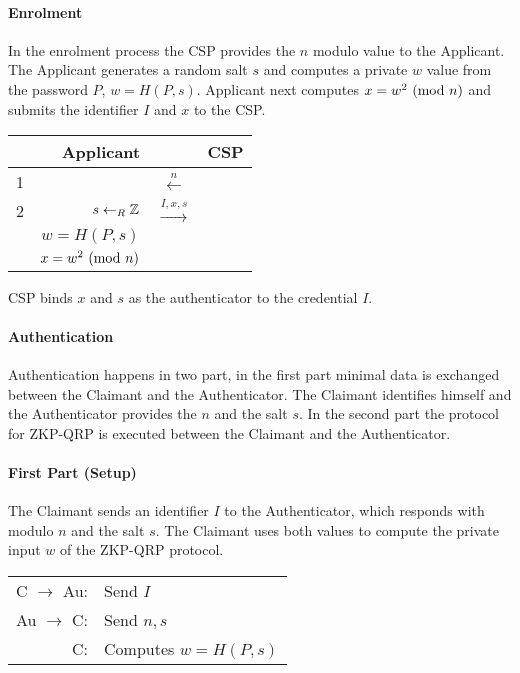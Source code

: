 \paragraph{Enrolment} In the enrolment process the CSP provides the $n$ modulo value to the Applicant.
The Applicant generates a random salt $s$ and computes a private $w$ value from the password $P$, $w = H(P, s)$.
Applicant next computes $x = w^2 \ (\mathrm{mod}\ n)$ and submits the identifier $I$ and $x$ to the CSP.

\bigskip

\begin{center}
	\begin{tabular}{rrcl}
		& Applicant & & CSP\\
		\hline
		1 & & $\xleftarrow{n}$ \\
		2 & $s \leftarrow_R \Bbb{Z}$ & $\xrightarrow{I, x, s}$ \\ & $w = H(P, s)$ \\ &$x = w^2 \ (\mathrm{mod}\ n)$
	\end{tabular}
\end{center}

\bigskip

CSP binds $x$ and $s$ as the authenticator to the credential $I$.

\paragraph{Authentication}

Authentication happens in two part, in the first part minimal data is exchanged between the Claimant and the Authenticator. The Claimant identifies himself and the Authenticator provides the $n$ and the salt $s$. %
In the second part the protocol for ZKP-QRP is executed between the Claimant and the Authenticator. %



\bigskip

\paragraph{First Part (Setup)}

The Claimant sends an identifier $I$ to the Authenticator, which responds with modulo $n$ and the salt $s$. The Claimant uses both values to compute the private input $w$ of the ZKP-QRP protocol.

\bigskip

\begin{center} %
	\begin{tabular}{rl}
	C $\rightarrow$ Au: & Send $I$\\
	Au $\rightarrow$ C: & Send $n, s$\\
	C: & Computes $w = H(P, s)$\\
\end{tabular}
\end{center}

